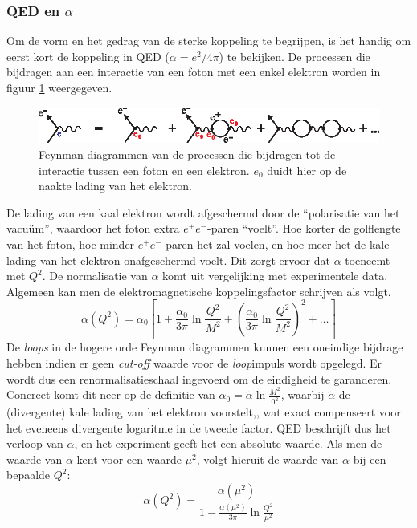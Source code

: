 \documentclass[a4paper,11pt]{article}
\numberwithin{equation}{section} %
\begin{document}
    \subsubsection{QED en $\alpha$} \label{sec:QED}
Om de vorm en het gedrag van de sterke koppeling te begrijpen, is het handig om eerst kort de koppeling in QED ($\alpha = e^2/4\pi$) te bekijken.
De processen die bijdragen aan een interactie van een foton met een enkel elektron worden in figuur \ref{fig:QED} weergegeven.
\begin{figure} [H]
  \begin{center}
    \includegraphics[width=.66\textwidth]{Afbeeldingen/QED.eps}
    \caption{Feynman diagrammen van de processen die bijdragen tot de interactie tussen een foton en een elektron. $e_0$ duidt hier op de naakte lading van het elektron.}
   \label{fig:QED}
  \end{center}
\end{figure}
De lading van een kaal elektron wordt afgeschermd door de “polarisatie van het vacuüm”, waardoor het foton extra $e^+ e^-$-paren “voelt”.
Hoe korter de golflengte van het foton, hoe minder $e^+ e^-$-paren het zal voelen, en hoe meer het de kale lading van het elektron onafgeschermd voelt.
Dit zorgt ervoor dat $\alpha$ toeneemt met $Q^2$.
De normalisatie van $\alpha$ komt uit vergelijking met experimentele data.
Algemeen kan men de elektromagnetische koppelingsfactor schrijven als volgt.
\begin{equation}
\alpha(Q^2) = \alpha_0 \left[ 1+ \frac{\alpha_0}{3\pi} \ln{\frac{Q^2}{M^2}} + \left( \frac{\alpha_0}{3\pi} \ln{\frac{Q^2}{M^2}} \right)^2 +\hdots \right]
\end{equation}
De \textit{loops} in de hogere orde Feynman diagrammen kunnen een oneindige bijdrage hebben indien er geen \textit{cut-off} waarde voor de \textit{loop}impuls wordt opgelegd.
Er wordt dus een renormalisatieschaal ingevoerd om de eindigheid te garanderen.
Concreet komt dit neer op de definitie van $\alpha_0 = \tilde{\alpha} \ln{\frac{M^2}{0^2}}$, waarbij $\tilde{\alpha}$ de (divergente) kale lading van het elektron voorstelt,, wat exact compenseert voor het eveneens divergente logaritme in de tweede factor.
QED beschrijft dus het verloop van $\alpha$, en het experiment geeft het een absolute waarde.
Als men de waarde van $\alpha$ kent voor een waarde $\mu^2$, volgt hieruit de waarde van $\alpha$ bij een bepaalde $Q^2$:
\begin{equation} \label{eq:alpha}
\alpha( Q^2 ) =\frac{\alpha(\mu^2)}{1-\frac{\alpha(\mu^2)}{3\pi} \ln{\frac{Q^2}{\mu^2}}}
\end{equation}
\end{document}
